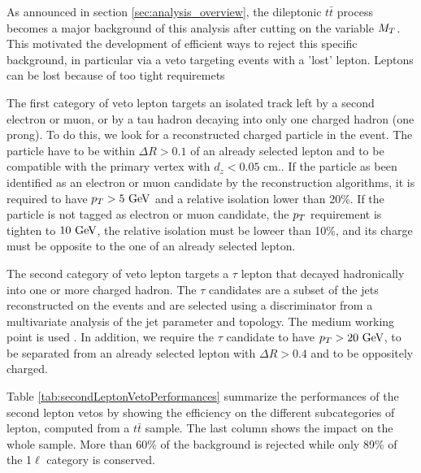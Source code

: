     As announced in section \ref{sec:analysis_overview}, the dileptonic $t\bar{t}$ 
    process becomes a major background of this analysis after cutting on the variable $M_T$.
    This motivated the development of efficient ways to reject this specific background, 
    in particular via a veto targeting events with a 'lost' lepton.
    Leptons can be lost
    because of too tight requiremets 

    The first category of veto lepton targets an isolated track left by a second 
    electron or muon, or by a tau hadron decaying into only one charged hadron (one prong). 
    To do this, we look for a reconstructed charged particle in the event. The particle 
    have to be within $\Delta R > 0.1$ of an already selected lepton and to be compatible 
    with the primary vertex with $d_z < 0.05$ cm.. If the particle as been identified as 
    an electron or muon candidate by the  reconstruction algorithms, it is required to 
    have $p_T > 5~\text{GeV}$ and a relative isolation lower than 20\%. If the particle is not 
    tagged as electron or muon candidate, the $p_T$ requirement is tighten to $10~\text{GeV}$, 
    the relative isolation must be loweer than 10\%, and its charge must be opposite to 
    the one of an already selected lepton.

    The second category of veto lepton targets a $\tau$ lepton that decayed hadronically into one or more charged hadron.
    The $\tau$ candidates are a subset of the jets reconstructed on the events and are selected using a discriminator
    from a multivariate analysis of the jet parameter and topology. The medium working point is used .
    In addition, we require the $\tau$ candidate to have $p_T > 20~\text{GeV}$, to be separated from an already selected
    lepton with $\Delta R > 0.4$ and to be oppositely charged. 

    Table \ref{tab:secondLeptonVetoPerformances} summarize the performances of the second lepton vetos by showing the
    efficiency on the different subcategories of lepton, computed from a $t\bar{t}$ sample. The last column shows the
    impact on the whole sample. More than 60\% of the background is rejected while only 89\% of the 1$\ell$ category is
    conserved.


